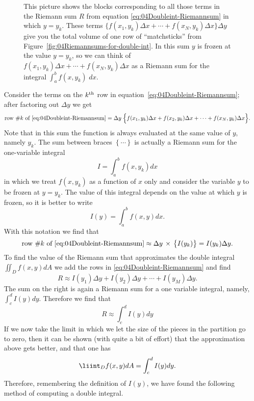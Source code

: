 \begin{figure}[b]
  
  \caption{
  This picture shows the blocks corresponding to all those terms in
  the Riemann sum $R$ from equation
  \eqref{eq:04Doubleint-Riemannsum} in which $y=y_k$.  These terms $
  \big\{f(x_1, y_k)\Delta x+\cdots+f(x_N, y_k)\Delta x\bigr\}\Delta
  y $ give you the total volume of one row of ``matchsticks'' from
  Figure~\ref{fig:04Riemannsums-for-double-int}.  In this sum $y$ is
  frozen at the value $y=y_k$, so we can think of $f(x_1,
  y_k)\Delta x+\cdots+f(x_N, y_k)\Delta x$ as a Riemann sum for the
  integral $\int_a^b f(x, y_k)\; dx$.}
\end{figure}

Consider the terms on the $k^{\rm th}$ row in
equation~\eqref{eq:04Doubleint-Riemannsum}; after factoring out
$\Delta y$ we get
\[
\text{row \#$k$ of \eqref{eq:04Doubleint-Riemannsum}} = 
\Delta y\; \Bigl\{
f(x_1, y_k) \Delta x + f(x_2, y_k)\Delta x + \cdots + f(x_N, y_k) \Delta x
\Bigr\}.
\]
Note that in this sum the function is always evaluated at the same
value of $y$, namely $y_k$.  The sum between braces $\left\{ \cdots
\right\}$ is actually a Riemann sum for the one-variable integral
\[
I = \int_a^b f(x, y_k) dx
\]
in which we treat $f(x, y_k)$ as a function of $x$ only and consider
the variable $y$ to be frozen at $y=y_k$.
The value of this integral depends on the value at which 
$y$ is frozen, so it is better to write
\[
I(y) = \int_a^b f(x, y) dx.
\]
With this notation we find that 
\[
\text{row \#$k$ of \eqref{eq:04Doubleint-Riemannsum}} 
\approx \Delta y\,\times\,\bigl\{I(y_k)\bigr\} = I(y_k) \Delta y.
\]
To find the value of the Riemann sum that approximates the double
integral $\iint_D f(x,y) dA$ we add the rows in
\eqref{eq:04Doubleint-Riemannsum} and find
\[
R \approx I(y_1)\Delta y+I(y_2) \Delta y + \cdots + I(y_M)\Delta y.
\]
The sum on the right is again a Riemann sum for a one variable
integral, namely, $\int_c^d I(y)dy$.  Therefore we find that 
\[
R\approx \int_c^d I(y) dy 
\]
If we now take the limit in which we let the size of the pieces in the
partition go to zero, then it can be shown (with quite a bit of
effort) that the approximation above gets better, and that one has
\[
\liint_D f(x, y) dA = \int _c^d I(y) dy.
\]
Therefore, remembering the definition of $I(y)$, we have found the
following method of computing a double integral.

